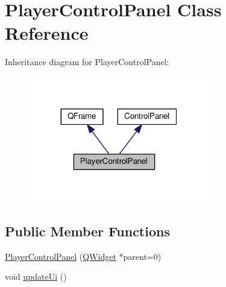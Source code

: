 \hypertarget{classGUI_1_1PlayerControlPanel}{}\section{Player\+Control\+Panel Class Reference}
\label{classGUI_1_1PlayerControlPanel}


Inheritance diagram for Player\+Control\+Panel\+:
\nopagebreak
\begin{figure}[H]
\begin{center}
\leavevmode
\includegraphics[width=224pt]{classGUI_1_1PlayerControlPanel__inherit__graph}
\end{center}
\end{figure}
\subsection*{Public Member Functions}
\begin{DoxyCompactItemize}
\item 
\hyperlink{classGUI_1_1PlayerControlPanel_a0432cd20dc9d144a23a8f8323fd68022}{Player\+Control\+Panel} (\hyperlink{classGUI_1_1QWidget}{Q\+Widget} $\ast$parent=0)
\item 
void \hyperlink{classGUI_1_1PlayerControlPanel_ae13c7f95f1ceda0fec18d18c3d7619f6}{update\+Ui} ()
\end{DoxyCompactItemize}

